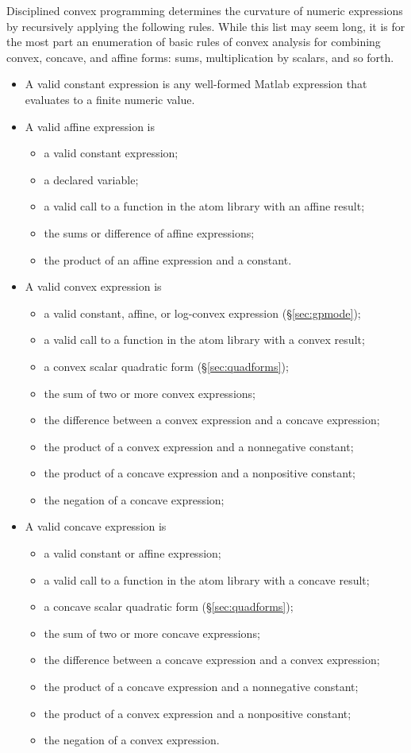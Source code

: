 \documentclass[12pt]{article}
\begin{document}
Disciplined convex programming determines the curvature of numeric
expressions by recursively applying the following rules.
While this list may seem long, it is for the most part an enumeration of basic
rules of convex analysis for combining convex, concave, and affine forms: sums,
multiplication by scalars, and so forth.
\begin{itemize}
\item A valid constant expression 
is any well-formed Matlab expression that 
evaluates to a finite numeric value.
\item A valid affine expression is
\begin{itemize}
\item a valid constant expression;
\item a declared %
variable;
\item a valid call to a function in the atom library with an affine result;
\item the sums or difference of affine expressions;
\item the product of an affine expression and a constant.
\end{itemize}
\item A valid convex expression is
\begin{itemize}
\item a valid constant, affine, or log-convex expression 
(\S\ref{sec:gpmode});
\item a valid call to a function in the atom library with a convex result;
\item a convex scalar quadratic form (\S\ref{sec:quadforms});
\item the sum of two or more convex expressions;
\item the difference between a convex expression and a concave expression;
\item the product of a convex expression and a nonnegative constant;
\item the product of a concave expression and a nonpositive constant;
\item the negation of a concave expression;
\end{itemize}
\item A valid concave expression is
\begin{itemize}
\item a valid constant or affine expression;
\item a valid call to a function in the atom library with a concave result;
\item a concave scalar quadratic form (\S\ref{sec:quadforms});
\item the sum of two or more concave expressions;
\item the difference between a concave expression and a convex expression;
\item the product of a concave expression and a nonnegative constant; 
\item the product of a convex expression and a nonpositive constant;
\item the negation of a convex expression.
\end{itemize}
\end{itemize}
\end{document}
